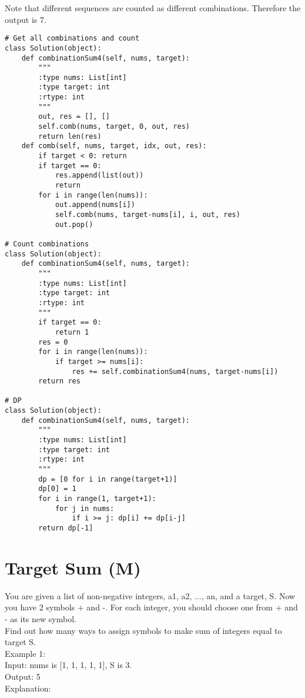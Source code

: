 Note that different sequences are counted as different combinations. Therefore the output is 7.\\

\begin{lstlisting}
# Get all combinations and count
class Solution(object):
    def combinationSum4(self, nums, target):
        """
        :type nums: List[int]
        :type target: int
        :rtype: int
        """
        out, res = [], []
        self.comb(nums, target, 0, out, res)
        return len(res)
    def comb(self, nums, target, idx, out, res):
        if target < 0: return
        if target == 0:
            res.append(list(out))
            return
        for i in range(len(nums)):
            out.append(nums[i])
            self.comb(nums, target-nums[i], i, out, res)
            out.pop()

# Count combinations
class Solution(object):
    def combinationSum4(self, nums, target):
        """
        :type nums: List[int]
        :type target: int
        :rtype: int
        """
        if target == 0:
            return 1
        res = 0
        for i in range(len(nums)):
            if target >= nums[i]:
                res += self.combinationSum4(nums, target-nums[i])
        return res
    
# DP
class Solution(object):
    def combinationSum4(self, nums, target):
        """
        :type nums: List[int]
        :type target: int
        :rtype: int
        """
        dp = [0 for i in range(target+1)]
        dp[0] = 1
        for i in range(1, target+1):
            for j in nums:
                if i >= j: dp[i] += dp[i-j]
        return dp[-1]
\end{lstlisting}

\section{Target Sum (M)}
 You are given a list of non-negative integers, a1, a2, ..., an, and a target, S. Now you have 2 symbols + and -. For each integer, you should choose one from + and - as its new symbol.\\

Find out how many ways to assign symbols to make sum of integers equal to target S.\\

Example 1:\\

Input: nums is [1, 1, 1, 1, 1], S is 3. \\
Output: 5\\
Explanation: \\

